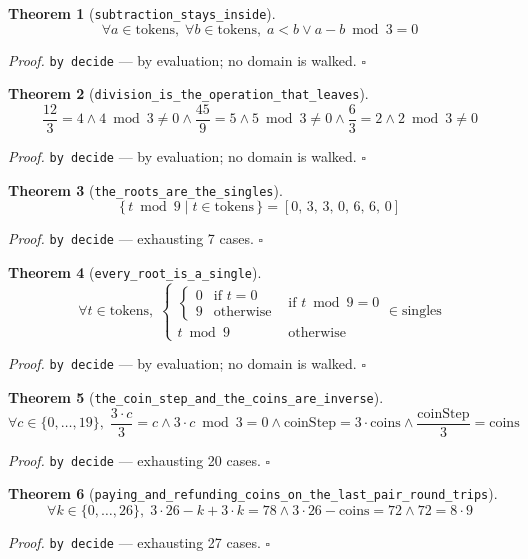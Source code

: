 \documentclass[11pt]{article}
\newtheorem{theorem}{Theorem}[section]
\begin{document}
\begin{theorem}[\texttt{subtraction\_stays\_inside}]
\[ \forall a \in \mathrm{tokens},\; \forall b \in \mathrm{tokens},\; a < b \lor a - b \bmod 3 = 0 \]
\end{theorem}
\noindent\emph{Proof.} \texttt{by decide} --- by evaluation; no domain is walked. \hfill$\square$

\begin{theorem}[\texttt{division\_is\_the\_operation\_that\_leaves}]
\[ \frac{12}{3} = 4 \land 4 \bmod 3 \neq 0 \land \frac{45}{9} = 5 \land 5 \bmod 3 \neq 0 \land \frac{6}{3} = 2 \land 2 \bmod 3 \neq 0 \]
\end{theorem}
\noindent\emph{Proof.} \texttt{by decide} --- by evaluation; no domain is walked. \hfill$\square$

\begin{theorem}[\texttt{the\_roots\_are\_the\_singles}]
\[ \{\, t \bmod 9 \mid t \in \mathrm{tokens} \,\} = [0,\,3,\,3,\,0,\,6,\,6,\,0] \]
\end{theorem}
\noindent\emph{Proof.} \texttt{by decide} --- exhausting 7 cases. \hfill$\square$

\begin{theorem}[\texttt{every\_root\_is\_a\_single}]
\[ \forall t \in \mathrm{tokens},\; \begin{cases}\begin{cases}0 & \text{if } t = 0\\ 9 & \text{otherwise}\end{cases} & \text{if } t \bmod 9 = 0\\ t \bmod 9 & \text{otherwise}\end{cases} \in \mathrm{singles} \]
\end{theorem}
\noindent\emph{Proof.} \texttt{by decide} --- by evaluation; no domain is walked. \hfill$\square$

\begin{theorem}[\texttt{the\_coin\_step\_and\_the\_coins\_are\_inverse}]
\[ \forall c \in \{0,\dots,19\},\; \frac{3 \cdot c}{3} = c \land 3 \cdot c \bmod 3 = 0 \land \mathrm{coinStep} = 3 \cdot \mathrm{coins} \land \frac{\mathrm{coinStep}}{3} = \mathrm{coins} \]
\end{theorem}
\noindent\emph{Proof.} \texttt{by decide} --- exhausting 20 cases. \hfill$\square$

\begin{theorem}[\texttt{paying\_and\_refunding\_coins\_on\_the\_last\_pair\_round\_trips}]
\[ \forall k \in \{0,\dots,26\},\; 3 \cdot 26 - k + 3 \cdot k = 78 \land 3 \cdot 26 - \mathrm{coins} = 72 \land 72 = 8 \cdot 9 \]
\end{theorem}
\noindent\emph{Proof.} \texttt{by decide} --- exhausting 27 cases. \hfill$\square$
\end{document}
